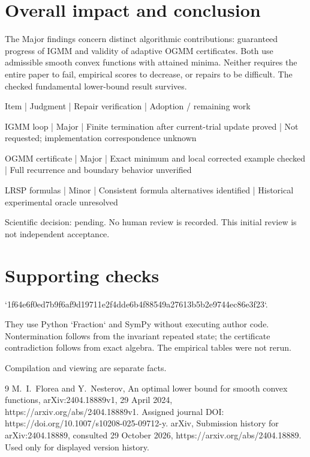 \documentclass[10pt]{article}
\begin{document}
\section*{Overall impact and conclusion}
The Major findings concern distinct algorithmic contributions: guaranteed progress of IGMM and validity of adaptive OGMM certificates. Both use admissible smooth convex functions with attained minima. Neither requires the entire paper to fail, empirical scores to decrease, or repairs to be difficult. The checked fundamental lower-bound result survives.\par
Item | Judgment | Repair verification | Adoption / remaining work\par
IGMM loop | Major | Finite termination after current-trial update proved | Not requested; implementation correspondence unknown\par
OGMM certificate | Major | Exact minimum and local corrected example checked | Full recurrence and boundary behavior unverified\par
LRSP formulas | Minor | Consistent formula alternatives identified | Historical experimental oracle unresolved\par
Scientific decision: pending. No human review is recorded. This initial review is not independent acceptance.\par
\section*{Supporting checks}
`1f64e6f0ed7b9f6af9d19711e2f4dde6b4f88549a27613b5b2e9744ec86e3f23`.\par
They use Python `Fraction` and SymPy without executing author code. Nontermination follows from the invariant repeated state; the certificate contradiction follows from exact algebra. The empirical tables were not rerun.\par
Compilation and viewing are separate facts.\par
9 M. I. Florea and Y. Nesterov, An optimal lower bound for smooth convex functions, arXiv:2404.18889v1, 29 April 2024, https://arxiv.org/abs/2404.18889v1. Assigned journal DOI: https://doi.org/10.1007/s10208-025-09712-y. arXiv, Submission history for arXiv:2404.18889, consulted 29 October 2026, https://arxiv.org/abs/2404.18889. Used only for displayed version history.\par
\end{document}
